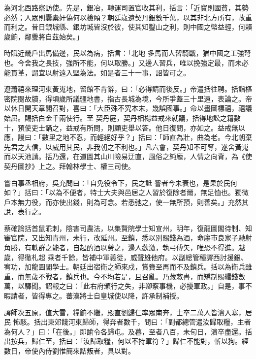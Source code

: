 \begin{pinyinscope}
 為河北西路察訪使。先是，銀冶，轉運司置官收其利，括言：「近寶則國貧，其勢必然；人眾則囊橐奸偽何以檢頤？朝廷歲遺契丹銀數千萬，以其非北方所有，故重而利之。昔日銀城縣、銀坊城皆沒於彼，使其知鑿山之利，則中國之幣益輕，何賴歲餉，鄰釁將自茲始矣。」



 時賦近畿戶出馬備邊，民以為病，括言：「北地
 多馬而人習騎戰，猶中國之工強弩也。今舍我之長技，強所不能，何以取勝。」又邊人習兵，唯以挽強定最，而未必能貫革，謂宜以射遠入堅為法。如是者三十一事，詔皆可之。



 遼蕭禧來理河東黃嵬地，留館不肯辭，曰：「必得請而後反。」帝遣括往聘。括詣樞密院閱故牘，得頃歲所議疆地書，指古長城為境，今所爭蓋三十里遠，表論之。帝以休日開天章閣召對，喜曰：「大臣殊不究本末，幾誤國事。」命以畫圖標禧，禧議始屈。賜括白金千兩使行。至
 契丹庭，契丹相楊益戒來就議，括得地訟之籍數十，預使吏士誦之，益戒有所問，則顧吏舉以答。他日復問，亦如之。益戒無以應，謾曰：「數里之地不忍，而輕絕好乎？」括曰：「師直為壯，曲為老。今北朝棄先君之大信，以威用其民，非我朝之不利也。」凡六會，契丹知不可奪，遂舍黃嵬而以天池請。括乃還，在道圖其山川險易迂直，風俗之純龐，人情之向背，為《使契丹圖抄》上之。拜翰林學士、權三司使。



 嘗白事丞相府，吳充問曰：「自免役令下，民之詆
 訾者今未衰也，是果於民何如？」括曰：「以為不便者，特士大夫與邑居之人習於復除者爾，無足恤也。獨微戶本無力役，而亦使出錢，則為可念。若悉弛之，使一無所預，則善矣。」充然其說，表行之。



 蔡確論括首鼠乖刺，陰害司農法，以集賢院學士知宣州，明年，復龍圖閣待制、知審官院，又出知青州，未行，改延州。至鎮，悉以別賜錢為酒，命廛市良家子馳射角勝，有軼群之能者，自起酌酒以勞之，邊人歡激，執弓傅矢，唯恐不得進。越歲，得徹札超
 乘者千餘，皆補中軍義從，威聲雄他府。以副總管種諤西討援銀、宥功，加龍圖閣學士。朝廷出宿衛之師來戍，賞賚至再而不及鎮兵。括以為衛兵雖重，而無歲不戰者，鎮兵也。今不均若是，且召亂。乃藏敕書，而矯制賜緡錢數萬，以驛聞。詔報之曰：「此右府頒行之失，非卿察事機，必擾軍政。」自是，事不暇請者，皆得專之。蕃漢將士自皇城使以降，許承制補授。



 諤師次五原，值大雪，糧餉不繼，殿直劉歸仁率眾南奔，士卒二萬人皆潰入塞，居民
 怖駭。括出東郊餞河東歸師，得奔者數千，問曰：「副都總管遣汝歸取糧，主者為何人？」曰：「在後。」即諭令各歸屯。及暮，至者八百，未旬日，潰卒盡還。括出按兵，歸仁至，括曰：「汝歸取糧，何以不持軍符？」歸仁不能對，斬以狗。經數日，帝使內侍劉惟簡來詰叛者，具以對。




\end{pinyinscope}
